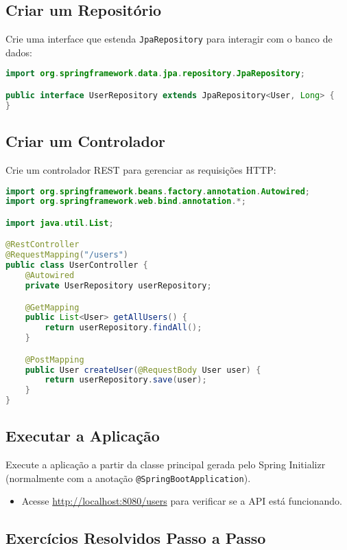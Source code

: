 \documentclass[a4paper,12pt]{book}
\begin{document}
\subsection{Criar um Repositório}

Crie uma interface que estenda \texttt{JpaRepository} para interagir com o banco de dados:
\begin{lstlisting}[language=java]
import org.springframework.data.jpa.repository.JpaRepository;

public interface UserRepository extends JpaRepository<User, Long> {
}
\end{lstlisting}

\subsection{Criar um Controlador}

Crie um controlador REST para gerenciar as requisições HTTP:
\begin{lstlisting}[language=java]
import org.springframework.beans.factory.annotation.Autowired;
import org.springframework.web.bind.annotation.*;

import java.util.List;

@RestController
@RequestMapping("/users")
public class UserController {
    @Autowired
    private UserRepository userRepository;

    @GetMapping
    public List<User> getAllUsers() {
        return userRepository.findAll();
    }

    @PostMapping
    public User createUser(@RequestBody User user) {
        return userRepository.save(user);
    }
}
\end{lstlisting}

\subsection{Executar a Aplicação}

Execute a aplicação a partir da classe principal gerada pelo Spring Initializr (normalmente com a anotação \texttt{@SpringBootApplication}).
\begin{itemize}
    \item Acesse \url{http://localhost:8080/users} para verificar se a API está funcionando.
\end{itemize}


\subsection{Exercícios Resolvidos Passo a Passo}
\end{document}
